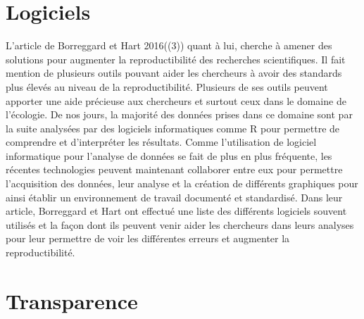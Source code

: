 \documentclass[9pt,twocolumn,twoside,]{pnas-new}
\begin{document}
\hypertarget{logiciels}{%
\section{Logiciels}\label{logiciels}}

L'article de Borreggard et Hart 2016((3)) quant à lui, cherche à amener
des solutions pour augmenter la reproductibilité des recherches
scientifiques. Il fait mention de plusieurs outils pouvant aider les
chercheurs à avoir des standards plus élevés au niveau de la
reproductibilité. Plusieurs de ses outils peuvent apporter une aide
précieuse aux chercheurs et surtout ceux dans le domaine de l'écologie.
De nos jours, la majorité des données prises dans ce domaine sont par la
suite analysées par des logiciels informatiques comme R pour permettre
de comprendre et d'interpréter les résultats. Comme l'utilisation de
logiciel informatique pour l'analyse de données se fait de plus en plus
fréquente, les récentes technologies peuvent maintenant collaborer entre
eux pour permettre l'acquisition des données, leur analyse et la
création de différents graphiques pour ainsi établir un environnement de
travail documenté et standardisé. Dans leur article, Borreggard et Hart
ont effectué une liste des différents logiciels souvent utilisés et la
façon dont ils peuvent venir aider les chercheurs dans leurs analyses
pour leur permettre de voir les différentes erreurs et augmenter la
reproductibilité.

\hypertarget{transparence}{%
\section{Transparence}\label{transparence}}
\end{document}
